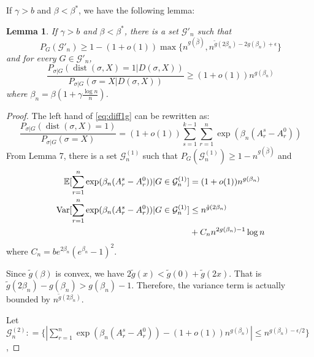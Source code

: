 \documentclass[journal]{IEEEtran}
\newtheorem{lemma}{Lemma}
\newcommand{\cG}{\mathcal{G}}
\newcommand{\1}{\mathbbm{1}}
\DeclareMathOperator{\Var}{Var}
\DeclareMathOperator{\dist}{dist}
\begin{document}
If $\gamma > b$ and $\beta < \beta^*$, we have the following lemma:
\begin{lemma}\label{prop:large2}
	If $\gamma > b$ and $\beta < \beta^*$, there is a set $\cG'_n$ such that
	\begin{equation}
	P_G(\cG'_n) \geq 1 - (1+o(1))\max\{n^{g(\bar{\beta})}, n^{\tilde{g}(2\beta_n) - 2g(\beta_n) + \epsilon} \}
	\end{equation}
	and for every $G \in \cG'_n$,
	\begin{equation}\label{eq:diff1g}
	\frac{P_{\sigma|G}(\dist(\sigma, X)=1 | D(\sigma, X))}
	{P_{\sigma|G}(\sigma=X | D(\sigma, X))} \geq (1+o(1))n^{g(\beta_n)}
	\end{equation}
	where $\beta_n = \beta(1+\gamma\frac{\log n}{n})$.
\end{lemma}
\begin{proof}
The left hand of \eqref{eq:diff1g} can be rewritten as:
\begin{equation}\label{eq:knd}
	\frac{P_{\sigma|G}(\dist(\sigma, X)=1)}
{P_{\sigma|G}(\sigma=X)}= (1+o(1))\sum_{s=1}^{k-1}\sum_{r=1}^n \exp(\beta_n (A_r^s - A_r^0))
\end{equation}
From Lemma 7, there is a set $\cG^{(1)}_n$ such that $P_G(\cG^{(1)}_n) \geq 1-n^{g(\bar{\beta})}$
and
\begin{align}
\mathbb{E}[\sum_{r=1}^n \exp(\beta_n (A_r^s - A_r^0)) | G \in \cG^{(1)}_n] &= (1+o(1))n^{g(\beta_n)} \\
\Var[\sum_{r=1}^n \exp(\beta_n (A_r^s - A_r^0)) | G \in \cG^{(1)}_n] &\leq n^{\tilde{g}(2\beta_n)} \notag \\
&+ C_n n^{2g(\beta_n)-1}\log n
\end{align}
where $C_n = be^{2\beta_n}(e^{\beta_n}-1)^2$.

Since $\tilde{g}(\beta)$ is convex,
we have $2\tilde{g}(x) < \tilde{g}(0) + \tilde{g}(2x)$. That is $\tilde{g}(2\beta_n) - g(\beta_n) > g(\beta_n) - 1$.
Therefore, the variance term is actually bounded by $n^{\tilde{g}(2\beta_n)} $.

Let $\cG^{(2)}_n: = \{|\sum_{r=1}^n \exp(\beta_n (A_r^s - A_r^0)) - (1+o(1))n^{g(\beta_n)}  | \leq n^{g(\beta_n) - \epsilon / 2} \}$,


\end{proof}
\end{document}
